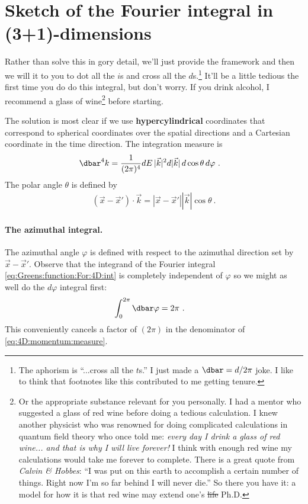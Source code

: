  


\section{Sketch of the Fourier integral in (3+1)-dimensions}

Rather than solve this in gory detail, we'll just provide the framework and then we will it to you to dot all the $i$s and cross all the $d$s.\footnote{The aphorism is ``...cross all the $t$s.'' I just made a $\dbar = d/2\pi$ joke. I like to think that footnotes like this contributed to me getting tenure.}  It'll be a little tedious the first time you do do this integral, but don't worry. If you drink alcohol, I recommend a glass of wine\footnote{Or the appropriate substance relevant for you personally. I had a mentor who suggested a glass of red wine before doing a tedious calculation. I knew another physicist who was renowned for doing complicated calculations in quantum field theory who once told me: \emph{every day I drink a glass of red wine... and that is why I will live forever!} I think with enough red wine my calculations would take me forever to complete. There is a great quote from \emph{Calvin \& Hobbes}: ``I was put on this earth to accomplish a certain number of things. Right now I’m so far behind I will never die.'' So there you have it: a model for how it is that red wine may extend one's \sout{life} Ph.D.} before starting.

The solution is most clear if we use \textbf{hypercylindrical} coordinates that correspond to spherical coordinates over the spatial directions and a Cartesian coordinate in the time direction. The integration measure is
\begin{align}
  \dbar^4k &= \frac{1}{(2\pi)^4} dE \, |\vec{k}|^2 d|\vec{k}|\, d\cos\theta \, d\varphi \ .
  \label{eq:4D:momentum:measure}
\end{align}
The polar angle $\theta$ is defined by 
\begin{align}
  (\vec{x}-\vec{x}')\cdot \vec{k} = |\vec{x}-\vec{x}'||\vec {k}| \cos\theta \ .
\end{align}

\paragraph{The azimuthal integral.}
The azimuthal angle $\varphi$ is defined with respect to the azimuthal direction set by $\vec{x}-\vec{x}'$. Observe that the integrand of the Fourier integral \eqref{eq:Greens:function:For:4D:int} is completely independent of $\varphi$ so we might as well do the $d\varphi$ integral first:
\begin{align}
  \int_0^{2\pi} \dbar \varphi &= 2\pi \ .
\end{align}
This conveniently cancels a factor of $(2\pi)$ in the denominator of \eqref{eq:4D:momentum:measure}.

